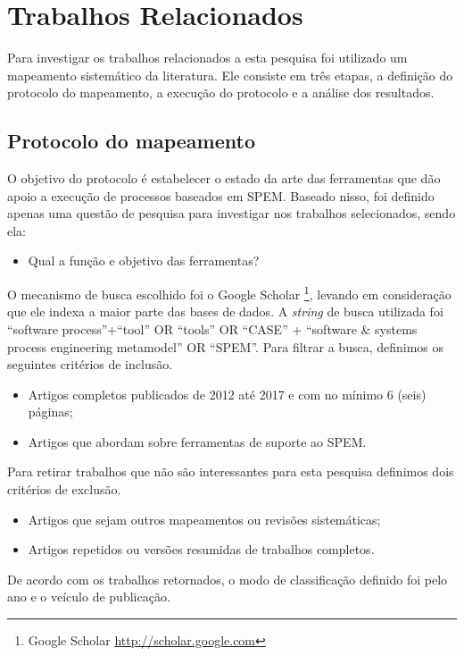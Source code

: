 \section{Trabalhos Relacionados}\label{sec:trabalhosRelacionados}
Para investigar os trabalhos relacionados a esta pesquisa foi utilizado um mapeamento sistemático da literatura. Ele consiste em três etapas, a definição do protocolo do mapeamento, a execução do protocolo e a análise dos resultados.


\subsection{Protocolo do mapeamento}\label{sub:trabalhosRelacionados_metodologia}
O objetivo do protocolo é estabelecer o estado da arte das ferramentas que dão apoio a execução de processos baseados em SPEM. Baseado nisso, foi definido apenas uma questão de pesquisa para investigar nos trabalhos selecionados, sendo ela:

\begin{itemize}
	\item Qual a função e objetivo das ferramentas?
\end{itemize}

O mecanismo de busca escolhido foi o Google Scholar \footnote{Google Scholar \url{http://scholar.google.com}}, levando em consideração que ele indexa a maior parte das bases de dados. A \textit{string} de busca utilizada foi ``software process''+``tool'' OR ``tools'' OR ``CASE'' + ``software \& systems process engineering metamodel'' OR ``SPEM''. Para filtrar a busca, definimos os seguintes critérios de inclusão.

\begin{itemize}
	\item Artigos completos publicados de 2012 até 2017 e com no mínimo 6 (seis) páginas;
	\item Artigos que abordam sobre ferramentas de suporte ao SPEM.
\end{itemize}

Para retirar trabalhos que não são interessantes para esta pesquisa definimos dois critérios de exclusão.
\begin{itemize}
	\item Artigos que sejam outros mapeamentos ou revisões sistemáticas;
	\item Artigos repetidos ou versões resumidas de trabalhos completos.
\end{itemize}
De acordo com os trabalhos retornados, o modo de classificação definido foi pelo ano e o veículo de publicação.

